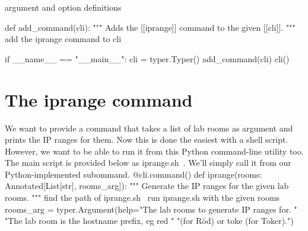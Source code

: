 \LA{}argument and option definitions~{\nwtagstyle{}}\RA{}

def add_command(cli):
  """
  Adds the [[iprange]] command to the given [[cli]].
  """
  \LA{}add the \code{}iprange\edoc{} command to \code{}cli\edoc{}~{\nwtagstyle{}}\RA{}

if __name__ == "__main__":
  cli = typer.Typer()
  add_command(cli)
  cli()
\nwendcode{}\nwdocspar


\section{The {\Tt{}iprange\nwendquote} command}

We want to provide a command that takes a list of lab rooms as argument and 
prints the IP ranges for them.
Now this is done the easiest with a shell script.
However, we want to be able to run it from this Python command-line utility 
too.
The main script is provided below as {\Tt{}\LA{}iprange.sh~{\nwtagstyle{}}\RA{}\nwendquote}.
We'll simply call it from our Python-implemented subommand.
\nwenddocs{}\endmoddef\nwstartdeflinemarkup{}\nwenddeflinemarkup
@cli.command()
def iprange(rooms: Annotated[List[str], rooms_arg]):
  """
  Generate the IP ranges for the given lab rooms.
  """
  \LA{}find the path of \code{}iprange.sh\edoc{}~{\nwtagstyle{}}\RA{}
  \LA{}run \code{}iprange.sh\edoc{} with the given \code{}rooms\edoc{}~{\nwtagstyle{}}\RA{}
\nwendcode{}\endmoddef\nwstartdeflinemarkup{}\nwenddeflinemarkup
rooms_arg = typer.Argument(help="The lab rooms to generate IP ranges for. "
                                "The lab room is the hostname prefix, eg red "
                                "(for Röd) or toke (for Toker).")
\nwendcode{}\nwdocspar

